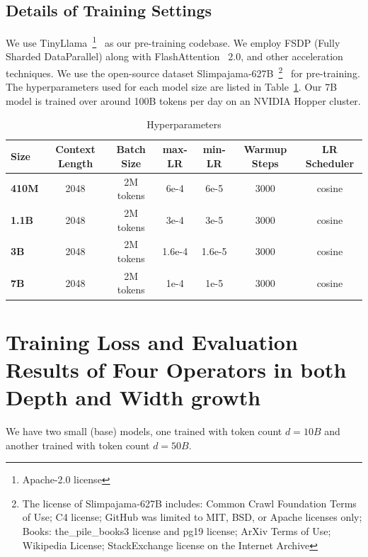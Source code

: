 \documentclass{article}
\begin{document}
\subsection{Details of Training Settings}\label{app:training_details}
We use TinyLlama~\footnote{Apache-2.0 license}~\cite{zhang2024tinyllama} as our pre-training codebase. We employ FSDP (Fully Sharded DataParallel) along with FlashAttention~\cite{dao2022flashattention} 2.0, and other acceleration techniques. We use the open-source dataset Slimpajama-627B~\footnote{The license of Slimpajama-627B includes: Common Crawl Foundation Terms of Use; C4 license; GitHub was limited to MIT, BSD, or Apache licenses only; Books: the\_pile\_books3 license and pg19 license; ArXiv Terms of Use; Wikipedia License; StackExchange license on the Internet Archive}~\cite{cerebras2023slimpajama} for pre-training. The hyperparameters used for each model size are listed in Table~\ref{tab:hyperparam}. Our 7B model is trained over around 100B tokens per day on an NVIDIA Hopper cluster.

\begin{table}[H]
\caption{Hyperparameters}\label{tab:hyperparam}\vspace{2mm}
    \centering
    \small
    \begin{tabular}{lcccccc}
        \hline
        \toprule
         \textbf{Size} & \textbf{Context Length} & \textbf{Batch Size} & \textbf{max-LR} & \textbf{min-LR} & \textbf{Warmup Steps} & \textbf{LR Scheduler} \\
        \hline
        \textbf{410M} & 2048 & 2M tokens & 6e-4 & 6e-5 & 3000 & cosine \\
        \textbf{1.1B} & 2048 & 2M tokens & 3e-4 & 3e-5 & 3000 & cosine \\
        \textbf{3B} & 2048 & 2M tokens & 1.6e-4 & 1.6e-5 & 3000 & cosine \\
        \textbf{7B} & 2048 & 2M tokens & 1e-4 & 1e-5 & 3000 & cosine \\
        \hline
        \bottomrule
    \end{tabular}
\end{table}

\section{Training Loss and Evaluation Results of Four Operators in both Depth and Width growth}\label{app:eval_main}

We have two small (base) models, one trained with token count $d=10B$ and another trained with token count $d=50B$.
\end{document}
